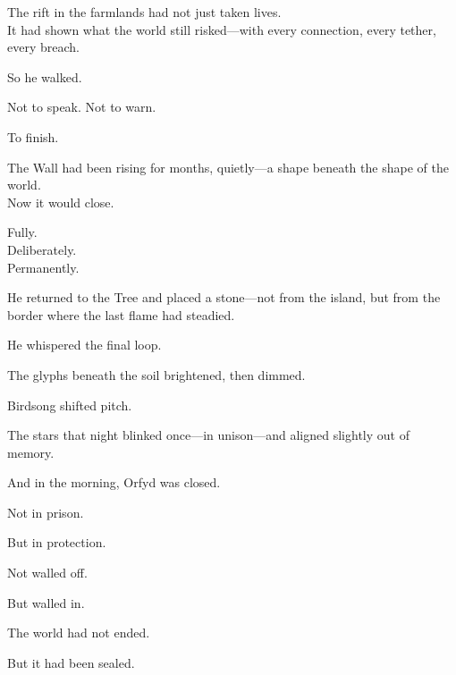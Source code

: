 \documentclass[9pt]{article}
\begin{document}
\vspace{0.5em}
The rift in the farmlands had not just taken lives.\\
It had shown what the world still risked---with every connection, every tether, every breach.

\vspace{0.5em}
So he walked.

\vspace{0.5em}
Not to speak. Not to warn.

\vspace{0.5em}
To finish.

\vspace{0.5em}
The Wall had been rising for months, quietly---a shape beneath the shape of the world.\\
Now it would close.

\vspace{0.5em}
Fully.\\
Deliberately.\\
Permanently.

\vspace{0.5em}
He returned to the Tree and placed a stone---not from the island, but from the border where the last flame had steadied.

\vspace{0.5em}
He whispered the final loop.

\vspace{0.5em}
The glyphs beneath the soil brightened, then dimmed.

\vspace{0.5em}
Birdsong shifted pitch.

\vspace{0.5em}
The stars that night blinked once---in unison---and aligned slightly out of memory.

\vspace{0.5em}
And in the morning, Orfyd was closed.

\vspace{0.5em}
Not in prison.

\vspace{0.5em}
But in protection.

\vspace{0.5em}
Not walled off.

\vspace{0.5em}
But walled in.

\vspace{0.5em}
The world had not ended.

\vspace{0.5em}
But it had been sealed.
\end{document}
